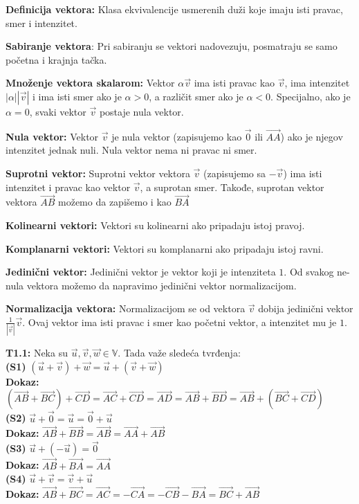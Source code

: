 \documentclass[12pt]{article}
\newcommand{\vek}[1]{\overrightarrow{#1}}
\begin{document}
\textbf{Definicija vektora:} Klasa ekvivalencije usmerenih duži koje imaju isti
pravac, smer i intenzitet.
\par

\textbf{Sabiranje vektora}: Pri sabiranju se vektori nadovezuju, posmatraju se
samo početna i krajnja tačka.
\par

\textbf{Množenje vektora skalarom:} Vektor $\alpha\vek{v}$ ima isti pravac
kao $\vek{v}$, ima intenzitet $|\alpha||\vek{v}|$ i ima isti smer ako je
$\alpha>0$, a različit smer ako je $\alpha<0$. Specijalno, ako je $\alpha=0$,
svaki vektor $\vek{v}$ postaje nula vektor.
\par

\textbf{Nula vektor:} Vektor $\vek{v}$ je nula vektor (zapisujemo kao $\vek{0}$
ili $\vek{AA}$) ako je njegov intenzitet jednak nuli. Nula vektor nema ni
pravac ni smer.
\par

\textbf{Suprotni vektor:} Suprotni vektor vektora $\vek{v}$ (zapisujemo sa
$-\vek{v}$) ima isti intenzitet i pravac kao vektor $\vek{v}$, a suprotan smer.
Takođe, suprotan vektor vektora $\vek{AB}$ možemo da zapišemo i kao $\vek{BA}$
\par

\textbf{Kolinearni vektori:} Vektori su kolinearni ako pripadaju istoj pravoj.
\par

\textbf{Komplanarni vektori:} Vektori su komplanarni ako pripadaju istoj ravni.
\par

\textbf{Jedinični vektor:} Jedinični vektor je vektor koji je intenziteta $1$.
Od svakog ne-nula vektora možemo da napravimo jedinični vektor normalizacijom.
\par

\textbf{Normalizacija vektora:} Normalizacijom se od vektora $\vek{v}$ dobija
jedinični vektor $\frac{1}{|\vek{v}|}\vek{v}$. Ovaj vektor ima isti pravac
i smer kao početni vektor, a intenzitet mu je $1$.
\par

\textbf{T1.1:} Neka su $\vek{u}, \vek{v}, \vek{w}\in\mathbb{V}$. Tada važe
sledeća tvrđenja:\\
\textbf{(S1)}
$(\vek{u}+\vek{v})+\vek{w}=\vek{u}+(\vek{v}+\vek{w})$\\
\textbf{Dokaz:}
$(\vek{AB}+\vek{BC})+\vek{CD}=\vek{AC}+\vek{CD}=\vek{AD}=\vek{AB}+\vek{BD}
    =\vek{AB}+(\vek{BC}+\vek{CD})$\\
\textbf{(S2)}
$\vek{u}+\vek{0}=\vek{u}=\vek{0}+\vek{u}$\\
\textbf{Dokaz:}
$\vek{AB}+\vek{BB}=\vek{AB}=\vek{AA}+\vek{AB}$\\
\textbf{(S3)}
$\vek{u}+(-\vek{u})=\vek{0}$\\
\textbf{Dokaz:}
$\vek{AB}+\vek{BA}=\vek{AA}$\\
\textbf{(S4)}
$\vek{u}+\vek{v}=\vek{v}+\vek{u}$\\
\textbf{Dokaz:}
$\vek{AB}+\vek{BC}=\vek{AC}=-\vek{CA}=-\vek{CB}-\vek{BA}=\vek{BC}+\vek{AB}$
\end{document}
